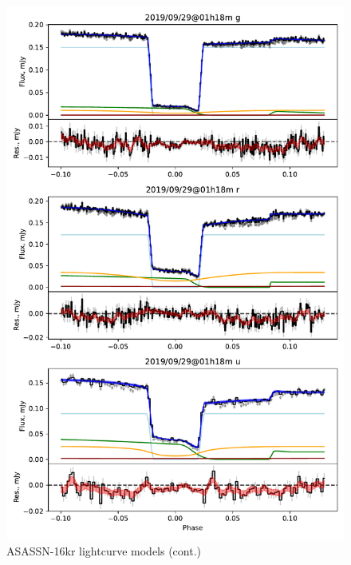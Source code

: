 \begin{figure}
    \centering
    \includegraphics[width=\textwidth]{figures/results/three_cvs_with_weird_colours/ASASSN-16kr/ASASSN-16kr_6.pdf}
    \caption{ASASSN-16kr lightcurve models (cont.)}
    \label{fig:ASASSN-16kr all lightcurves cont 5}
\end{figure}
